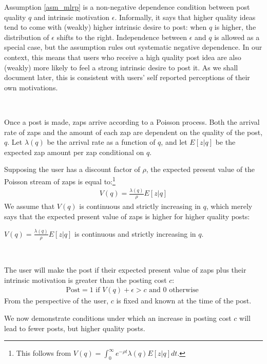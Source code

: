 Assumption \ref{asm_mlrp} is a non-negative dependence condition between post quality $q$ and intrinsic motivation $\epsilon$. Informally, it says that higher quality ideas tend to come with (weakly) higher intrinsic desire to post: when $q$ is higher, the distribution of $\epsilon$ shifts to the right. Independence between $\epsilon$ and $q$ is allowed as a special case, but the assumption rules out systematic negative dependence. In our context, this means that users who receive a high quality post idea are also (weakly) more likely to feel a strong intrinsic desire to post it. As we shall document later, this is consistent with users' self reported perceptions of their own motivations. \hfill \qedsymbol

~

\noindent Once a post is made, zaps arrive according to a Poisson process. Both the arrival rate of zaps and the amount of each zap are dependent on the quality of the post, $q$. Let $\lambda(q)$ be the arrival rate as a function of $q$, and let $E[z|q]$ be the expected zap amount per zap conditional on $q$. 

Supposing the user has a discount factor of $\rho$, the expected present value of the Poisson stream of zaps is equal to:\footnote{This follows from $V(q) = \int_{0}^{\infty} e^{-\rho t} \lambda(q) E[z|q] dt$.}
\begin{align}
V(q) = \frac{\lambda(q)}{\rho} E \left[z | q\right] \label{eq_V}
\end{align}
We assume that $V(q)$ is continuous and strictly increasing in $q$, which merely says that the expected present value of zaps is higher for higher quality posts:

\begin{assumption}\label{asm_monotonicity}
$V(q) = \frac{\lambda(q)}{\rho} E[z|q]$ is continuous and strictly increasing in $q$.
\end{assumption}

~

\noindent  The user will make the post if their expected present value of zaps plus their intrinsic motivation is greater than the posting cost $c$:
\begin{align}
\text{Post} = 1 \text{ if } V(q) + \epsilon > c \text{ and } 0 \text{ otherwise }
\end{align}
From the perspective of the user, $c$ is fixed and known at the time of the post.

We now demonstrate conditions under which an increase in posting cost $c$ will lead to fewer posts, but higher quality posts.

